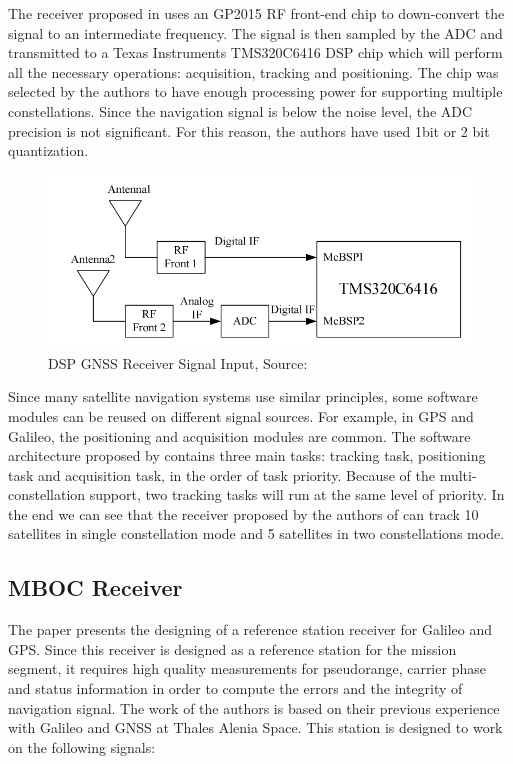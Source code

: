 The receiver proposed in \cite{dsp_receiver} uses an GP2015 RF front-end chip to down-convert the signal to an intermediate frequency. The signal is then sampled by the ADC and transmitted to a Texas Instruments TMS320C6416 DSP chip which will perform all the necessary operations: acquisition, tracking and positioning. The chip was selected by the authors to have enough processing power for supporting multiple constellations. Since the navigation signal is below the noise level, the ADC precision is not significant\cite{dsp_receiver}. For this reason, the authors have used 1bit or 2 bit quantization.

\begin{figure}[h]
\centering
\includegraphics[width=\textwidth]{img/dsp_gnss_signal.png}
\caption{DSP GNSS Receiver Signal Input, Source:\cite{dsp_receiver}}
\label{fig:galileo_frequency_plan}
\end{figure}

Since many satellite navigation systems use similar principles, some software modules can be reused on different signal sources. For example, in GPS and Galileo, the positioning and acquisition modules are common\cite{dsp_receiver}. The software architecture proposed by \cite{dsp_receiver} contains three main tasks: tracking task, positioning task and acquisition task, in the order of task priority. Because of the multi-constellation support, two tracking tasks will run at the same level of priority. In the end we can see that the receiver proposed by the authors of \cite{dsp_receiver} can track 10 satellites in single constellation mode and 5 satellites in two constellations mode.

\subsection{MBOC Receiver\cite{ref_station_receiver}}
\label{subsec:mboc_recv}

The paper \cite{ref_station_receiver} presents the designing of a reference station receiver for Galileo and GPS. Since this receiver is designed as a reference station for the mission segment, it requires high quality measurements for pseudorange, carrier phase and status information in order to compute the errors and the integrity of navigation signal\cite{ref_station_receiver}. The work of the authors is based on their previous experience with Galileo and GNSS at Thales Alenia Space. This station is designed to work on the following signals\cite{ref_station_receiver}:

